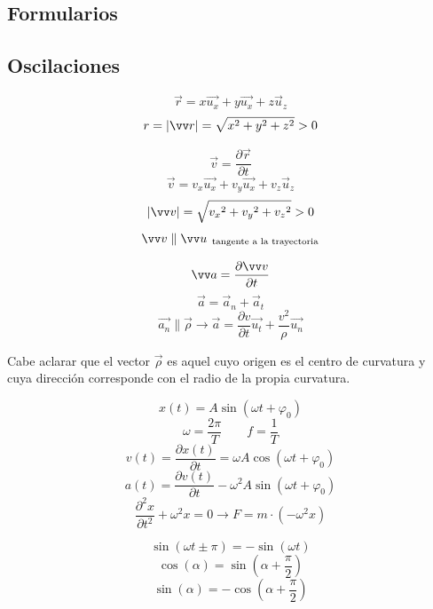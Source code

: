 \documentclass[a4paper]{book}
\begin{document}
\titlespacing*{\chapter}{0pt}{-19pt}{0pt}
\begin{landscape}

\setlength{\parskip}{0em}
\chapter{Formularios}
\section{Oscilaciones}
\setlength{\columnsep}{20pt}
\begin{fleqn}
	\begin{multicols}{4}
		\[\vec{r} = x \vec{u_x} + y \vec{u_x} + z \vec{u}_z \]
		\[r = \abs{\vec{r}} = \sqrt{x^2 +y^2+z^2} >0\]

		\[\vec{v} = \frac{\partial \vec{r}}{\partial t}\]
		\[\vec{v} = v_x \vec{u_x} + v_y \vec{u_x} + v_z \vec{u}_z\]
		\[\abs{\vec{v}} = \sqrt{{v_x}^2 +{v_y}^2+{v_z}^2} >0\]
		\[\vec{v} \parallel \vec{u}_\text{\, tangente a la trayectoria} \]

		\[\vec{a} =\pdv{\vec{v}}{t}\]
		\[\vec{a} = \vec{a}_n + \vec{a}_t\]
		\[\vec{a_n} \parallel \vec{\rho} \longrightarrow \vec{a} = \frac{\partial v}{\partial t}\vec{u_t} + \frac{v^2}{\rho }\vec{u_n}\]

		\noindent Cabe aclarar que el vector $\vec{\rho}$ es aquel cuyo origen es el centro de curvatura y cuya dirección corresponde con el radio de la propia curvatura.

		\[x(t) = A\sin{\left(\omega t + \varphi_0\right)}\]
		\[\omega = \frac{2\pi}{T} \qquad f = \frac{1}{T}\]
		\[v(t) = \frac{\partial x(t)}{\partial t} = \omega A \cos{\left(\omega t + \varphi_0\right)}\]
		\[a(t) = \frac{\partial v(t)}{\partial t} -\omega^2 A \sin{\left(\omega t + \varphi_0\right)}\]
		\[\frac{\partial ^2 x}{\partial t^2}+\omega^2 x = 0 \longrightarrow F= m\cdot \left( -\omega^2x \right)\]

		\vspace{2 cm}
		\[\sin{\left(\omega t \pm \pi \right)}= -\sin{\left(\omega t\right)}\]
		\[\cos{\left(\alpha\right)} = \sin{\left(\alpha + \frac{\pi}{2}\right)}\]
		\[\sin{\left(\alpha\right)} = - \cos{\left(\alpha + \frac{\pi}{2}\right)}\]


\end{multicols}
\end{fleqn}
\end{landscape}
\end{document}
